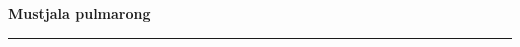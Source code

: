 \documentclass[10pt]{book}
\begin{document}
{
  \samepage
  \raggedbottom
  \raggedright
  \sloppy


  \vspace{0.2in}

  \noindent\begin{minipage}{.1\textwidth}
    \hfill\vspace{0.1in}
  \end{minipage}%
  \noindent\begin{minipage}{.8\textwidth}
    \centering
    \bfseries
    \large Mustjala pulmarong
  \end{minipage}%
  \noindent\begin{minipage}{.1\textwidth}
      \hfill\vspace{0.1in}
  \end{minipage}

  \nopagebreak[4]
  \vspace{0.1in}
  \nopagebreak[4]
  \hrule height 0.05ex
  \nopagebreak[4]
  \vspace{-0.05in}




}
\end{document}

